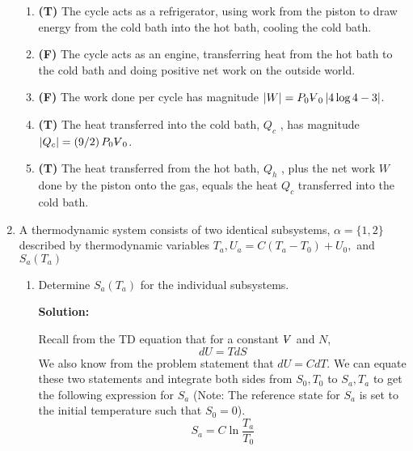 \documentclass[10pt]{article}
\newenvironment{Solution}
    {\textbf{Solution:}
    
    \vspace{5mm}
    \begin{tcolorbox}
    }
    {
    \end{tcolorbox}
    \vspace{5mm}
    }
\newcommand{\vol}{{\ooalign{\hfil$V$\hfil\cr\kern0.08em--\hfil\cr}}}
\begin{document}
\begin{enumerate}
\begin{enumerate}
    \item \textbf{(T)} The cycle acts as a refrigerator, using work from the piston to draw energy from the cold bath into the hot bath, cooling the cold bath.
    
    
    \item \textbf{(F)} The cycle acts as an engine, transferring heat from the hot bath to the cold bath and doing positive net work on the outside world.
    
    
    \item \textbf{(F)} The work done per cycle has magnitude $\left|W\right| = P_0 \vol_0 \left|4 \log{4} - 3\right|$.
    
    
    \item \textbf{(T)} The heat transferred into the cold bath, $Q_c$ , has magnitude $\left|Q_c \right| = \left(9/2\right)P_0 \vol_0$.
    
    \item \textbf{(T)} The heat transferred from the hot bath, $Q_h$ , plus the net work $W$ done by the piston onto the gas, equals the heat $Q_c$ transferred into the cold bath.
    
    
\end{enumerate}

\newpage

\item A thermodynamic system consists of two identical subsystems, $\alpha=\{1,2\}$ described by thermodynamic variables $T_{a}, U_{a}=C\left(T_{a}-T_{0}\right)+U_{0},$ and $S_{a}\left(T_{a}\right)$

\begin{enumerate}

\item Determine $S_{a}\left(T_{a}\right)$ for the individual subsystems.

\begin{Solution}
Recall from the TD equation that for a constant $\vol$ and $N$,
\begin{equation}\label{dutds}
    dU = T dS
\end{equation}
We also know from the problem statement that $dU = CdT$. We can equate these two statements and integrate both sides from $S_0, T_0$ to $S_a, T_a$ to get the following expression for $S_a$ (Note: The reference state for $S_a$ is set to the initial temperature such that $S_0 = 0$).
\begin{equation}
\boxed{
    S_a = C \ln{\frac{T_a}{T_0}}
    }
\end{equation}


\end{Solution}
\end{enumerate}
\end{enumerate}
\end{document}
